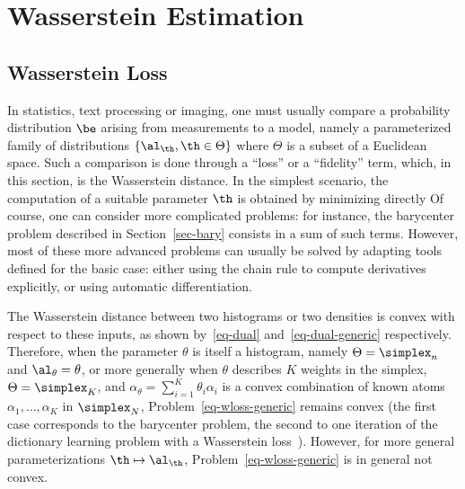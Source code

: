 

\chapter{Wasserstein Estimation}


\section{Wasserstein Loss}

In statistics, text processing or imaging, one must usually compare a probability distribution $\be$ arising from measurements to a model, namely a parameterized family of distributions $\{\al_\th,\th\in\Theta\}$ where $\Theta$ is a subset of a Euclidean space. Such a comparison is done through a ``loss'' or a ``fidelity'' term, which, in this section, is the Wasserstein distance.
%
In the simplest scenario, the computation of a suitable parameter $\th$ is obtained by minimizing directly
Of course, one can consider more complicated problems: for instance, the barycenter problem described in Section~\ref{sec-bary} consists in a sum of such terms. However, most of these more advanced problems can usually be solved by adapting tools defined for the basic case: either using the chain rule to compute derivatives explicitly, or using automatic differentiation. %

The Wasserstein distance between two histograms or two densities is convex with respect to these inputs, as shown by~\eqref{eq-dual} and~\eqref{eq-dual-generic} respectively. Therefore, when the parameter $\theta$ is itself a histogram, namely $\Theta=\simplex_n$ and $\al_\theta=\theta$, or more generally when $\theta$ describes $K$ weights in the simplex, $\Theta=\simplex_K$, and $\alpha_\theta=\sum_{i=1}^K \theta_i \alpha_i$ is a convex combination of known atoms $\alpha_1,\dots,\alpha_K$ in $\simplex_N$, Problem~\eqref{eq-wloss-generic} remains convex (the first case corresponds to the barycenter problem, the second to one iteration of the dictionary learning problem with a Wasserstein loss~\cite{pmlr-v51-rolet16}). However, for more general parameterizations $\th\mapsto \al_\th$, Problem~\eqref{eq-wloss-generic} is in general not convex.


